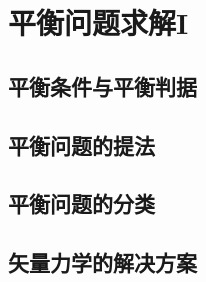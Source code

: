 

\section{平衡问题求解I}\label{4-3}

\subsection{平衡条件与平衡判据}\label{4-3-1}

\subsection{平衡问题的提法}\label{4-3-2}

\subsection{平衡问题的分类}\label{4-3-3}

\subsection{矢量力学的解决方案}\label{4-3-4}